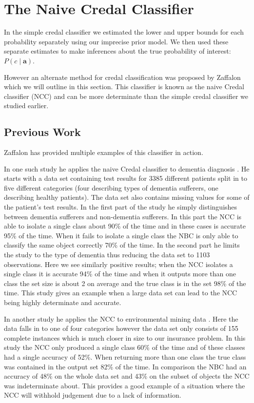 \chapter{The Naive Credal Classifier}

In the simple credal classifier we estimated the lower and upper bounds for each probability separately using our imprecise prior model.
We then used these separate estimates to make inferences about the true probability of interest: $P(c \mid \mathbf{a})$.

However an alternate method for credal classification was proposed by Zaffalon \cite{Zaffalon01} which we will outline in this section.
This classifier is known as the naive Credal classifier (NCC) and can be more determinate than the simple credal classifier we studied earlier.

\section{Previous Work}

Zaffalon has provided multiple examples of this classifier in action.

In one such study he applies the naive Credal classifier to dementia diagnosis \cite{Zaffalon03}.
He starts with a data set containing test results for 3385 different patients split in to five different categories (four describing types of dementia sufferers, one describing healthy patients).
The data set also contains missing values for some of the patient's test results.
In the first part of the study he simply distinguishes between dementia sufferers and non-dementia sufferers.
In this part the NCC is able to isolate a single class about 90\% of the time and in these cases is accurate 95\% of the time.
When it fails to isolate a single class the NBC is only able to classify the same object correctly 70\% of the time.
In the second part he limits the study to the type of dementia thus reducing the data set to 1103 observations.
Here we see similarly positive results; when the NCC isolates a single class it is accurate 94\% of the time and when it outputs more than one class the set size is about 2 on average and the true class is in the set 98\% of the time.
This study gives an example when a large data set can lead to the NCC being highly determinate and accurate.

In another study he applies the NCC to environmental mining data \cite{Zaffalon02}.
Here the data falls in to one of four categories however the data set only consists of 155 complete instances which is much closer in size to our insurance problem.
In this study the NCC only produced a single class 60\% of the time and of these classes had a single accuracy of 52\%.
When returning more than one class the true class was contained in the output set 82\% of the time.
In comparison the NBC had an accuracy of 48\% on the whole data set and 43\% on the subset of objects the NCC was indeterminate about.
This provides a good example of a situation where the NCC will withhold judgement due to a lack of information.

